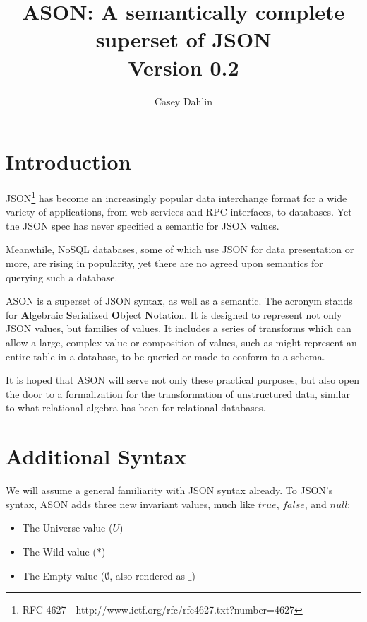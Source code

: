 \documentclass[letterpaper]{article}
\title{ASON: A semantically complete superset of JSON\\\normalsize\vspace{5mm} Version 0.2}
\author{Casey Dahlin}
\begin{document}
\setlength{\parskip}{1em}
\setlength{\parindent}{0em}
\newtheorem{prule}{Rule}
\newcommand{\kvpair}[2]{``#1":\quad#2,\quad}
\newcommand{\kvpaire}[2]{``#1":\quad#2}

\maketitle

\section{Introduction}
JSON\footnote{RFC 4627 - http://www.ietf.org/rfc/rfc4627.txt?number=4627} has
become an increasingly popular data interchange format for a wide variety of
applications, from web services and RPC interfaces, to databases. Yet the JSON
spec has never specified a semantic for JSON values.

Meanwhile, NoSQL databases, some of which use JSON for data presentation or
more, are rising in popularity, yet there are no agreed upon semantics for
querying such a database.

ASON is a superset of JSON syntax, as well as a semantic. The acronym stands
for \textbf{A}lgebraic \textbf{S}erialized \textbf{O}bject \textbf{N}otation.
It is designed to represent not only JSON values, but families of values. It
includes a series of transforms which can allow a large, complex value or
composition of values, such as might represent an entire table in a database,
to be queried or made to conform to a schema.

It is hoped that ASON will serve not only these practical purposes, but also
open the door to a formalization for the transformation of unstructured data,
similar to what relational algebra has been for relational databases.

\section{Additional Syntax}
\begin{samepage}
We will assume a general familiarity with JSON syntax already. To JSON's
syntax, ASON adds three new invariant values, much like \(true\), \(false\),
and \(null\):

\begin{itemize}
	\item The Universe value (\(U\))
	\item The Wild value (\(*\))
	\item The Empty value (\(\emptyset\), also rendered as \(\_\))
\end{itemize}
\end{samepage}
\end{document}
